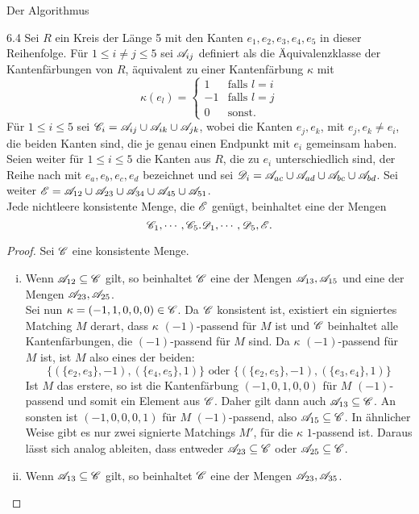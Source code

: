 \begin{section}{Der Algorithmus}
 \begin{lemmal}{ }{6.4}
  Sei $R$ ein Kreis der Länge 5 mit den Kanten $e_1,e_2,e_3,e_4,e_5$ in dieser Reihenfolge. Für $1 \leq i \neq j \leq 5$ sei $\mathscr{A}_{ij}$ definiert als die Äquivalenzklasse der Kantenfärbungen von $R$, äquivalent zu einer Kantenfärbung $\kappa$ mit 
  \[\kappa(e_l) = \begin{cases}
    1 &\text{falls } l = i\\
    -1 &\text{falls } l = j\\
    0 &\text{sonst.}
   \end{cases}\]
  Für $1 \leq i \leq 5$ sei $\mathscr{C}_i = \mathscr{A}_{ij}\cup\mathscr{A}_{ik}\cup\mathscr{A}_{jk}$, wobei die Kanten $e_j,e_k$, mit $e_j,e_k \neq e_i$, die beiden Kanten sind, die je genau einen Endpunkt mit $e_i$ gemeinsam haben. Seien weiter für $1\leq i \leq 5$ die Kanten aus $R$, die zu $e_i$ unterschiedlich sind, der Reihe nach mit $e_a,e_b,e_c,e_d$ bezeichnet und sei  $\mathscr{D}_i = \mathscr{A}_{ac}\cup\mathscr{A}_{ad}\cup\mathscr{A}_{bc}\cup\mathscr{A}_{bd}$. Sei weiter $\mathscr{E} = \mathscr{A}_{12}\cup\mathscr{A}_{23}\cup\mathscr{A}_{34}\cup\mathscr{A}_{45}\cup\mathscr{A}_{51}$.\\
  Jede nichtleere konsistente Menge, die $\mathscr{E}$ genügt, beinhaltet eine der Mengen 
  \[\mathscr{C}_1,\cdots,\mathscr{C}_5.\mathscr{D}_1,\cdots,\mathscr{D}_5,\mathscr{E}\text{.}\]
 \end{lemmal}
 \begin{proof}
  Sei $\mathscr{C}$ eine konsistente Menge.
  \begin{enumerate}[(i)]
   \item Wenn $\mathscr{A}_{12} \subseteq \mathscr{C}$ gilt, so beinhaltet $\mathscr{C}$ eine der Mengen $\mathscr{A}_{13},\mathscr{A}_{15}$ und eine der Mengen $\mathscr{A}_{23},\mathscr{A}_{25}$.\\
   Sei nun $\kappa = (-1,1,0,0,0) \in \mathscr{C}$. Da $\mathscr{C}$ konsistent ist, existiert ein signiertes Matching $M$ derart, dass $\kappa$ $(-1)$-passend für $M$ ist und $\mathscr{C}$ beinhaltet alle Kantenfärbungen, die $(-1)$-passend für $M$ sind. Da $\kappa$ $(-1)$-passend für $M$ ist, ist $M$ also eines der beiden:
   \[ \{(\{e_2,e_3\},-1),(\{e_4,e_5\},1)\} \text{ oder } \{(\{e_2,e_5\},-1),(\{e_3,e_4\},1)\} \]
   Ist $M$ das erstere, so ist die Kantenfärbung $(-1,0,1,0,0)$ für $M$ $(-1)$-passend und somit ein Element aus $\mathscr{C}$. Daher gilt dann auch $\mathscr{A}_{13}\subseteq\mathscr{C}$. An sonsten ist $(-1,0,0,0,1)$ für $M$ $(-1)$-passend, also $\mathscr{A}_{15}\subseteq\mathscr{C}$. In ähnlicher Weise gibt es nur zwei signierte Matchings $M'$, für die $\kappa$ $1$-passend ist. Daraus lässt sich analog ableiten, dass entweder $\mathscr{A}_{23}\subseteq\mathscr{C}$ oder $\mathscr{A}_{25}\subseteq\mathscr{C}$.
   \item Wenn $\mathscr{A}_{13} \subseteq \mathscr{C}$ gilt, so beinhaltet $\mathscr{C}$ eine der Mengen $\mathscr{A}_{23},\mathscr{A}_{35}$.\\

\end{enumerate}
\end{proof}
\end{section}
